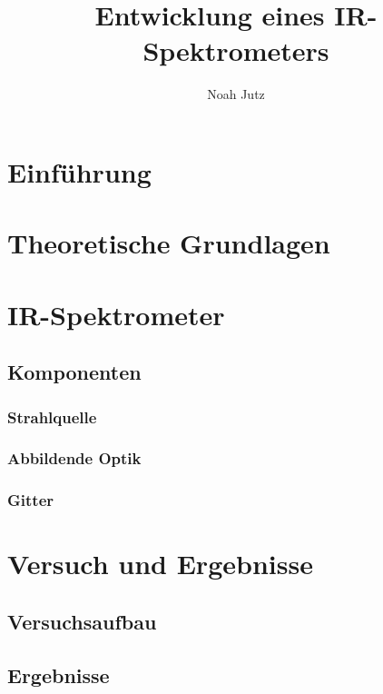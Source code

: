 \documentclass{article}
\title{Entwicklung eines IR-Spektrometers}
\author{Noah Jutz}
\date{}
\begin{document}
\maketitle

\tableofcontents

\section{Einführung}

\section{Theoretische Grundlagen}

\section{IR-Spektrometer}

\subsection{Komponenten}

\subsubsection{Strahlquelle}

\subsubsection{Abbildende Optik}

\subsubsection{Gitter}

\section{Versuch und Ergebnisse}

\subsection{Versuchsaufbau}

\subsection{Ergebnisse}
\end{document}
